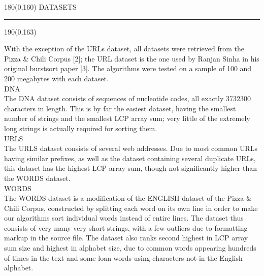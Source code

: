 %

\begin{textblock}{180}(0,160)
\sffamily\normalsize{\color{sciorange}DATASETS}\small\\
\rule[3mm]{190mm}{0.1pt}
\end{textblock} 
\begin{textblock}{190}(0,163)
 \footnotesize 
\begin{multicols}{3}
With the exception of the URLs dataset, all datasets were retrieved from
the Pizza \& Chili Corpus [2]; the URL dataset is the one used by Ranjan Sinha
in his original burstsort paper [3]. The algorithms were tested on a sample
of 100 and 200 megabytes with each dataset.\vspace{1.5mm}\\
{\sffamily\normalsize{\color{sciorange}DNA}}\small\\
\footnotesize 
The DNA dataset consists of sequences of nucleotide codes, all exactly $3732300$
characters in length.  This is by far the easiest dataset, having the smallest
number of strings and the smallest LCP array sum; very little of the extremely
long strings is actually required for sorting them.\vspace{1.5mm}\\
{\sffamily\normalsize{\color{sciorange}URLS}}\small\\
\footnotesize 
The URLS dataset consists of several web addresses.  Due to most common URLs
having similar prefixes, as well as the dataset containing several duplicate
URLs, this dataset has the highest LCP array sum, though not significantly
higher than the WORDS dataset.\vspace{1.5mm}\\
{\sffamily\normalsize{\color{sciorange}WORDS}}\small\\
\footnotesize 
The WORDS dataset is a modification of the ENGLISH dataset of the Pizza \& Chili
Corpus, constructed by splitting each word on its own line in order to make our
algorithms sort individual words instead of entire lines.  The dataset thus
consists of very many very short strings, with a few outliers due to formatting
markup in the source file.  The dataset also ranks second highest in LCP array
sum size and highest in alphabet size, due to common words appearing hundreds of
times in the text and some loan words using characters not in the English
alphabet.

\end{multicols}

\end{textblock} 

